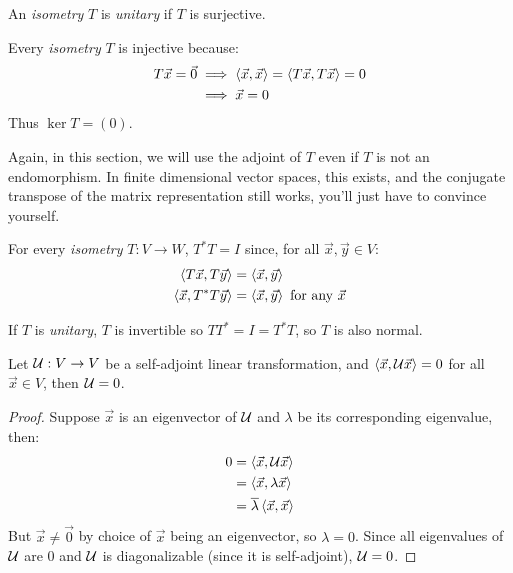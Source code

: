 \begin{definition}
  An \emph{isometry} $T$ is \emph{unitary} if $T$ is surjective.
\end{definition}

\begin{remark}
  Every \emph{isometry} $T$ is injective because:
    \begin{align}
      T \vec x = \vec 0
        &\implies \left\langle \vec x , \vec x \right\rangle = \left\langle T \vec x , T \vec x \right\rangle = 0 \\
        &\implies \vec x = 0
    \end{align}
  Thus $\ker T = (0)$.
\end{remark}

\begin{remark}
  Again, in this section, we will use the adjoint of $T$ even if $T$ is not an endomorphism.
  In finite dimensional vector spaces, this exists, and the conjugate transpose of the
  matrix representation still works, you'll just have to convince yourself.
\end{remark}

\begin{remark}
  For every \emph{isometry} $T : V \to W$, $T^*T = I$ since, for all $\vec x, \vec y \in V$:
  \begin{align}
    \left\langle T \vec x , T \vec y \right\rangle &= \left\langle \vec x , \vec y \right\rangle \\
    \left\langle \vec x , T^* T \vec y \right\rangle &= \left\langle \vec x , \vec y \right\rangle \text{ for any } \vec x
  \end{align}
\end{remark}

\begin{remark}
  If $T$ is \emph{unitary}, $T$ is invertible so $T T^* = I = T^* T$, so $T$ is also normal.
\end{remark}

\begin{lemma}\label{selfadjointlintranszero}
  Let $\mathcal{U} : V \to V$ be a self-adjoint linear transformation, and $\left\langle \vec x , \mathcal{U} \vec x \right\rangle = 0$ for all $\vec x \in V$,
  then $\mathcal{U} = 0$.
\end{lemma}
\begin{proof}
  Suppose $\vec x$ is an eigenvector of $\mathcal{U}$ and $\lambda$ be its corresponding eigenvalue, then:
  \begin{align}
    0 &= \left\langle \vec x , \mathcal{U} \vec x \right\rangle \\
      &= \left\langle \vec x , \lambda \vec x \right\rangle \\
      &= \overline{\lambda}\left\langle \vec x , \vec x \right\rangle
  \end{align}
  But $\vec x \ne \vec 0$ by choice of $\vec x$ being an eigenvector, so $\lambda = 0$.
  Since all eigenvalues of $\mathcal{U}$ are 0 and $\mathcal{U}$ is diagonalizable (since it is self-adjoint), $\mathcal{U} = 0$.
\end{proof}

